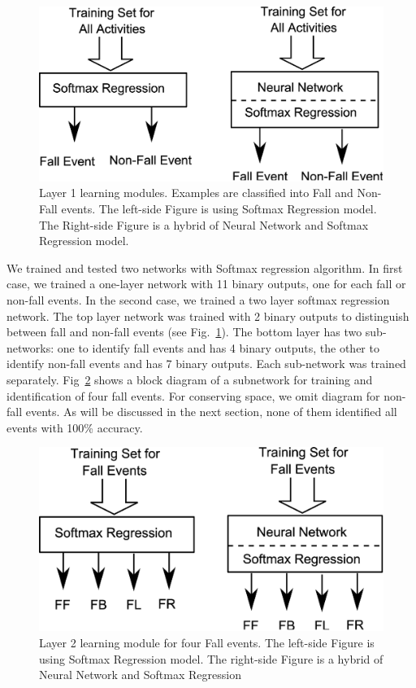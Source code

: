 \documentclass{IEEEtran}
\begin{document}
\begin{figure}[htbp]
	\centering
		\includegraphics[width=0.98\columnwidth]{figures/SoftmaxLayer1.eps}
	\caption{Layer 1 learning modules. Examples are classified into Fall and Non-Fall events.  The left-side Figure is using Softmax Regression model. The Right-side Figure is a hybrid of Neural Network and Softmax Regression model.}
	\label{fig:SoftmaxLayer1}
\end{figure}

We trained and tested two networks with Softmax regression algorithm. In first case, we trained a one-layer network with 11 binary outputs, one for each fall or non-fall events. In the second case, we trained a two layer softmax regression network. The top layer network was trained with 2 binary outputs to distinguish between fall and non-fall events (see Fig.~\ref{fig:SoftmaxLayer1}). The bottom layer has two sub-networks:  one to identify fall events and has 4 binary outputs, the other to identify non-fall events and has 7 binary outputs. Each sub-network was trained separately. Fig~\ref{fig:SoftmaxLayer2Fall} shows a block diagram of a subnetwork for training and identification of four fall events. For conserving space, we omit diagram for non-fall events. As will be discussed in the next section, none of them identified all events with 100\% accuracy.

\begin{figure}[htbp]
	\centering
		\includegraphics[width=0.98\columnwidth]{figures/SoftmaxLayer2Fall.eps}
	\caption{Layer 2 learning module for four Fall events. The left-side Figure is using Softmax Regression model. The right-side Figure is a hybrid of Neural Network and Softmax Regression }
	\label{fig:SoftmaxLayer2Fall}
\end{figure}
\end{document}
